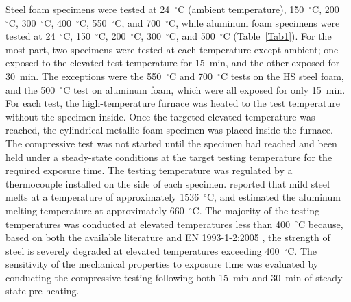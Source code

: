 \documentclass[review]{elsarticle}
\begin{document}
Steel foam specimens were tested at 24~$^{\circ}\mathrm{C}$ (ambient temperature), 150~$^{\circ}\mathrm{C}$, 200~$^{\circ}\mathrm{C}$, 300~$^{\circ}\mathrm{C}$, 400~$^{\circ}\mathrm{C}$, 550~$^{\circ}\mathrm{C}$, and 700~$^{\circ}\mathrm{C}$, while aluminum foam specimens were tested at 24~$^{\circ}\mathrm{C}$, 150~$^{\circ}\mathrm{C}$, 200~$^{\circ}\mathrm{C}$, 300~$^{\circ}\mathrm{C}$, and 500~$^{\circ}\mathrm{C}$ (Table~\ref{Tab1}). For the most part, two specimens were tested at each temperature except ambient; one exposed to the elevated test temperature for 15~min, and the other exposed for 30~min. The exceptions were the 550~$^{\circ}\mathrm{C}$ and 700~$^{\circ}\mathrm{C}$ tests on the HS steel foam, and the 500~$^{\circ}\mathrm{C}$ test on aluminum foam, which were all exposed for only 15~min. For each test, the high-temperature furnace was heated to the test temperature without the specimen inside. Once the targeted elevated temperature was reached, the cylindrical metallic foam specimen was placed inside the furnace. The compressive test was not started until the specimen had reached and been held under a steady-state conditions at the target testing temperature for the required exposure time. The testing temperature was regulated by a thermocouple installed on the side of each specimen. \cite{Avalloneetal2007} reported that mild steel melts at a temperature of approximately 1536~$^{\circ}\mathrm{C}$, and \cite{Ashsby2000} estimated the aluminum melting temperature at approximately 660~$^{\circ}\mathrm{C}$. The majority of the testing temperatures was conducted at elevated temperatures less than 400~$^{\circ}\mathrm{C}$ because, based on both the available literature and EN 1993-1-2:2005 \cite{EC3-1-2}, the strength of steel is severely degraded at elevated temperatures exceeding 400~$^{\circ}\mathrm{C}$. The sensitivity of the mechanical properties to exposure time was evaluated by conducting the compressive testing following both 15~min and 30~min of steady-state pre-heating.
\end{document}
